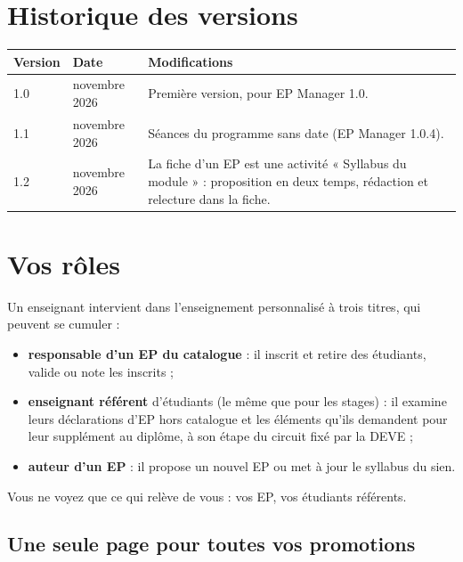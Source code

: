 \documentclass[11pt,a4paper]{article}
\begin{document}

\tableofcontents

\section*{Historique des versions}

\begin{center}
\begin{tabularx}{\linewidth}{@{}l l X@{}}
\toprule
\textbf{Version} & \textbf{Date} & \textbf{Modifications} \\
\midrule
1.0 & novembre 2026 & Première version, pour EP Manager 1.0. \\
1.1 & novembre 2026 & Séances du programme sans date (EP Manager 1.0.4). \\
1.2 & novembre 2026 & La fiche d'un EP est une activité « Syllabus du module » : proposition en deux temps, rédaction et relecture dans la fiche. \\
\bottomrule
\end{tabularx}
\end{center}

\newpage

\section{Vos rôles}

Un enseignant intervient dans l'enseignement personnalisé à trois titres, qui peuvent se
cumuler :
\begin{itemize}
  \item \textbf{responsable d'un EP du catalogue} : il inscrit et retire des étudiants, valide
    ou note les inscrits ;
  \item \textbf{enseignant référent} d'étudiants (le même que pour les stages) : il examine
    leurs déclarations d'EP hors catalogue et les éléments qu'ils demandent pour leur supplément
    au diplôme, à son étape du circuit fixé par la DEVE ;
  \item \textbf{auteur d'un EP} : il propose un nouvel EP ou met à jour le syllabus du sien.
\end{itemize}
Vous ne voyez que ce qui relève de vous : vos EP, vos étudiants référents.

\subsection{Une seule page pour toutes vos promotions}
\end{document}

